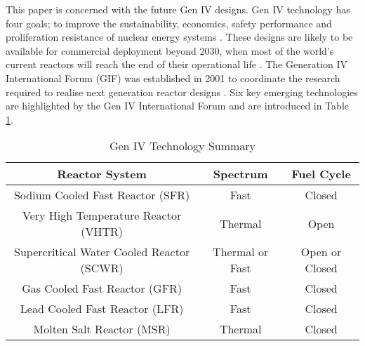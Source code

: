 \documentclass[journal]{IEEEtran}
\begin{document}
This paper is concerned with the future Gen IV designs. 
Gen IV technology has four goals; to improve the sustainability, economics, safety performance and proliferation resistance of nuclear energy systems \cite{GenIVRoadmap}. 
These designs are likely to be available for commercial deployment beyond 2030, when most of the world's current reactors will reach the end of their operational life \cite{schneider2012nuclear}. 
The Generation IV International Forum (GIF) was established in 2001 to coordinate the research required to realise next generation reactor designs \cite{GenIVRoadmap}. 
Six key emerging technologies are highlighted by the Gen IV International Forum \cite{GenIVRoadmap} and are introduced in Table \ref{table:GenIV}.

\begin{table}[!t]
\renewcommand{\arraystretch}{1.1}
\caption{Gen IV Technology Summary \cite{GenIVRoadmap}}
\label{table:GenIV}
\centering
\begin{tabular}{|c|c|c|}
\hline
\textbf{Reactor System} & \textbf{Spectrum} & \textbf{Fuel Cycle}\\
\hline
Sodium Cooled Fast Reactor (SFR) & Fast & Closed \\
\hline
Very High Temperature Reactor (VHTR) & Thermal & Open \\
\hline
Supercritical Water Cooled Reactor (SCWR) & Thermal or Fast & Open or Closed \\
\hline
Gas Cooled Fast Reactor (GFR) & Fast & Closed \\
\hline
Lead Cooled Fast Reactor (LFR) & Fast & Closed \\
\hline
Molten Salt Reactor (MSR) & Thermal & Closed \\
\hline

\end{tabular}
\end{table}
\end{document}
